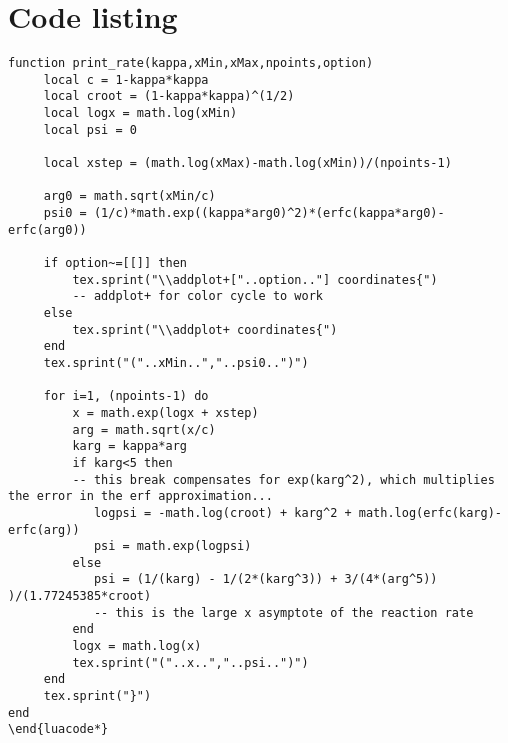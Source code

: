 

\chapter{Code listing}

%
%

\begin{lstlisting}
function print_rate(kappa,xMin,xMax,npoints,option)
     local c = 1-kappa*kappa
     local croot = (1-kappa*kappa)^(1/2)
     local logx = math.log(xMin)
     local psi = 0
     
     local xstep = (math.log(xMax)-math.log(xMin))/(npoints-1)
     
     arg0 = math.sqrt(xMin/c)
     psi0 = (1/c)*math.exp((kappa*arg0)^2)*(erfc(kappa*arg0)-erfc(arg0))
     
     if option~=[[]] then
  		 tex.sprint("\\addplot+["..option.."] coordinates{") 
  		 -- addplot+ for color cycle to work
     else
  		 tex.sprint("\\addplot+ coordinates{")
     end
     tex.sprint("("..xMin..","..psi0..")")
     
     for i=1, (npoints-1) do
  		 x = math.exp(logx + xstep)
  		 arg = math.sqrt(x/c)
  		 karg = kappa*arg
  		 if karg<5 then 
		 -- this break compensates for exp(karg^2), which multiplies the error in the erf approximation...
  		    logpsi = -math.log(croot) + karg^2 + math.log(erfc(karg)-erfc(arg))
  		    psi = math.exp(logpsi)
  		 else
  		    psi = (1/(karg) - 1/(2*(karg^3)) + 3/(4*(arg^5)) )/(1.77245385*croot)
  		    -- this is the large x asymptote of the reaction rate
  		 end
  		 logx = math.log(x)
  		 tex.sprint("("..x..","..psi..")")
     end
     tex.sprint("}")
end
\end{luacode*}
\end{lstlisting}
